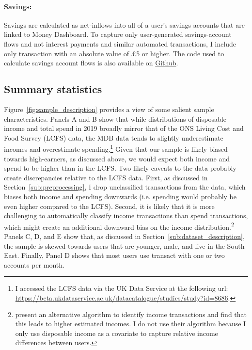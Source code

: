 \paragraph{Savings:} Savings are calculated as net-inflows into all of a user's
savings accounts that are linked to Money Dashboard. To capture only
user-generated savings-account flows and not interest payments and similar
automated transactions, I include only transaction with an absolute value of
\pounds5 or higher. The code used to calculate savings account flows is also
available on
\href{https://github.com/fabiangunzinger/mdb_eval/blob/f31bfcd7a330188cdd27968d41957ebf5b454099/src/data/aggregators.py#L89}{Github}.


\subsection{Summary statistics}%
\label{sub:summary_statistics}

Figure~\ref{fig:sample_description} provides a view of some salient sample
characteristics. Panels A and B show that while distributions of disposable
income and total spend in 2019 broadly mirror that of the ONS Living Cost and
Food Survey (LCFS) data, the MDB data tends to slightly underestimate incomes
and overestimate spending.\footnote{I accessed the LCFS data via the UK Data
Service at the following url:
\url{https://beta.ukdataservice.ac.uk/datacatalogue/studies/study?id=8686}.}
Given that our sample is likely biased towards high-earners, as discussed
above, we would expect both income and spend to be higher than in the LCFS. Two
likely caveats to the data probably create discrepancies relative to the LCFS
data. First, as discussed in Section~\ref{sub:preprocessing}, I drop
unclassified transactions from the data, which biases both income and spending
downwards (i.e. spending would probably be even higher compared to the LCFS).
Second, it is likely that it is more challenging to automatically classify
income transactions than spend transactions, which might create an additional
downward bias on the income distribution.\footnote{\citet{bourquin2020effects}
    present an alternative algorithm to identify income transactions and find
that this leads to higher estimated incomes. I do not use their algorithm
because I only use disposable income as a covariate to capture relative income
differences between users.} Panels C, D, and E show that, as discussed in
Section~\ref{sub:dataset_description}, the sample is skewed towards users that
are younger, male, and live in the South East. Finally, Panel D shows that most
users use transact with one or two accounts per month.

